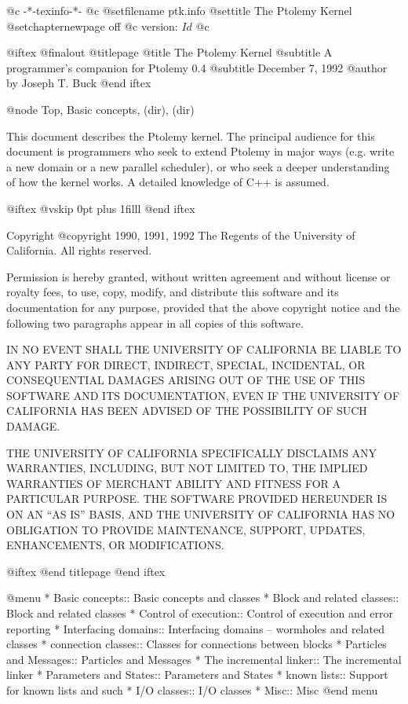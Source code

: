       @c -*-texinfo-*-
@c %
@setfilename ptk.info
@settitle The Ptolemy Kernel
@setchapternewpage off
@c version: $Id$
@c %

@iftex
@finalout
@titlepage
@title The Ptolemy Kernel
@subtitle A programmer's companion for Ptolemy 0.4
@subtitle December 7, 1992
@author by Joseph T. Buck
@end iftex

@node Top, Basic concepts, (dir), (dir)

This document describes the Ptolemy kernel.  The principal audience for
this document is programmers who seek to extend Ptolemy in major ways
(e.g. write a new domain or a new parallel scheduler), or who seek a
deeper understanding of how the kernel works.  A detailed knowledge of
C++ is assumed.

@iftex
@vskip 0pt plus 1filll
@end iftex

Copyright @copyright{} 1990, 1991, 1992 The Regents of the University of
California.  All rights reserved.

Permission is hereby granted, without written agreement and without
license or royalty fees, to use, copy, modify, and distribute this
software and its documentation for any purpose, provided that the above
copyright notice and the following two paragraphs appear in all copies of
this software.

IN NO EVENT SHALL THE UNIVERSITY OF CALIFORNIA BE LIABLE TO ANY PARTY FOR
DIRECT, INDIRECT, SPECIAL, INCIDENTAL, OR CONSEQUENTIAL DAMAGES ARISING
OUT OF THE USE OF THIS SOFTWARE AND ITS DOCUMENTATION, EVEN IF THE
UNIVERSITY OF CALIFORNIA HAS BEEN ADVISED OF THE POSSIBILITY OF SUCH
DAMAGE.

THE UNIVERSITY OF CALIFORNIA SPECIFICALLY DISCLAIMS ANY WARRANTIES,
INCLUDING, BUT NOT LIMITED TO, THE IMPLIED WARRANTIES OF MERCHANT ABILITY
AND FITNESS FOR A PARTICULAR PURPOSE. THE SOFTWARE PROVIDED HEREUNDER IS
ON AN ``AS IS'' BASIS, AND THE UNIVERSITY OF CALIFORNIA HAS NO OBLIGATION
TO PROVIDE MAINTENANCE, SUPPORT, UPDATES, ENHANCEMENTS, OR MODIFICATIONS.

@iftex
@end titlepage
@end iftex

@menu
* Basic concepts::              Basic concepts and classes
* Block and related classes::   Block and related classes
* Control of execution::        Control of execution and error reporting
* Interfacing domains::         Interfacing domains -- wormholes and related classes
* connection classes::          Classes for connections between blocks
* Particles and Messages::      Particles and Messages
* The incremental linker::      The incremental linker
* Parameters and States::       Parameters and States
* known lists::                 Support for known lists and such
* I/O classes::                 I/O classes
* Misc::                        Misc
@end menu

